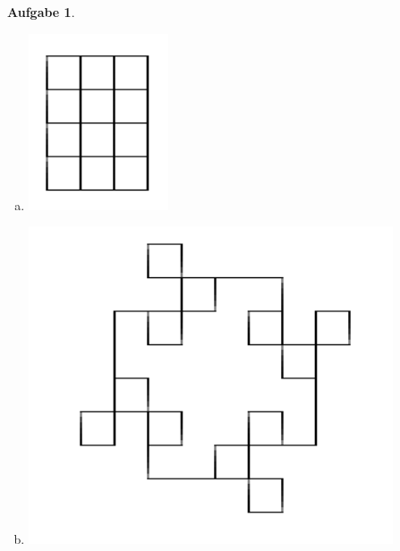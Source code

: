 \documentclass{article}
\newtheorem{aufgabe}{Aufgabe}[section]
\begin{document}
\begin{aufgabe}
\begin{paracol}{2}
\begin{enumerate}[(a)]
\item
\begin{minipage}{\linewidth}
\centering
\includegraphics[width=0.6\linewidth]{pictures/quadrate4x3.png}
\end{minipage}

\item
\begin{minipage}{\linewidth}
\centering
\includegraphics[width=\linewidth]{pictures/quadrate-gluecksklee.png}
\end{minipage}


\end{enumerate}
\end{paracol}
\end{aufgabe}
\end{document}
